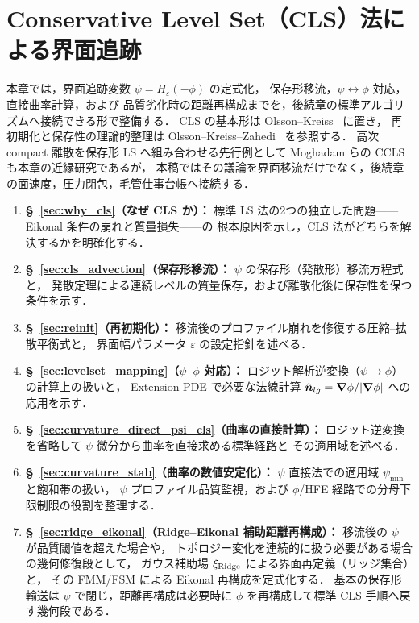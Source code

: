 \section{Conservative Level Set（CLS）法による界面追跡}
\label{sec:levelset}

本章では，界面追跡変数 $\psi = H_\varepsilon(-\phi)$ の定式化，
保存形移流，$\psi\leftrightarrow\phi$ 対応，直接曲率計算，および
品質劣化時の距離再構成までを，後続章の標準アルゴリズムへ接続できる形で整備する．
CLS の基本形は Olsson--Kreiss~\cite{OlssonKreiss2005} に置き，
再初期化と保存性の理論的整理は Olsson--Kreiss--Zahedi~\cite{OlssonKreissZahedi2007} を参照する．
高次 compact 離散を保存形 LS へ組み合わせる先行例として
Moghadam らの CCLS~\cite{MoghadamShafieefarPanahi2016} も本章の近縁研究であるが，
本稿ではその議論を界面移流だけでなく，後続章の面速度，圧力閉包，毛管仕事台帳へ接続する．

\begin{enumerate}
  \item \textbf{§~\ref{sec:why_cls}（なぜ CLS か）：}
        標準 LS 法の2つの独立した問題——Eikonal 条件の崩れと質量損失——の
        根本原因を示し，CLS 法がどちらを解決するかを明確化する．
  \item \textbf{§~\ref{sec:cls_advection}（保存形移流）：}
        $\psi$ の保存形（発散形）移流方程式と，
        発散定理による連続レベルの質量保存，および離散化後に保存性を保つ条件を示す．
  \item \textbf{§~\ref{sec:reinit}（再初期化）：}
        移流後のプロファイル崩れを修復する圧縮--拡散平衡式と，
        界面幅パラメータ $\varepsilon$ の設定指針を述べる．
  \item \textbf{§~\ref{sec:levelset_mapping}（$\psi$--$\phi$ 対応）：}
        ロジット解析逆変換（$\psi \to \phi$）の計算上の扱いと，
        Extension PDE で必要な法線計算 $\hat{\bm n}_{lg} = \bm{\nabla}\phi/|\bm{\nabla}\phi|$ への応用を示す．
  \item \textbf{§~\ref{sec:curvature_direct_psi_cls}（曲率の直接計算）：}
        ロジット逆変換を省略して $\psi$ 微分から曲率を直接求める標準経路と
        その適用域を述べる．
  \item \textbf{§~\ref{sec:curvature_stab}（曲率の数値安定化）：}
        $\psi$ 直接法での適用域 $\psi_{\min}$ と飽和帯の扱い，
        $\psi$ プロファイル品質監視，および $\phi$/HFE 経路での分母下限制限の役割を整理する．
  \item \textbf{§~\ref{sec:ridge_eikonal}（Ridge--Eikonal 補助距離再構成）：}
        移流後の $\psi$ が品質閾値を超えた場合や，
        トポロジー変化を連続的に扱う必要がある場合の幾何修復段として，
        ガウス補助場 $\xi_{\text{Ridge}}$ による界面再定義（リッジ集合）と，
        その FMM/FSM による Eikonal 再構成を定式化する．
        基本の保存形輸送は $\psi$ で閉じ，距離再構成は必要時に
        $\phi$ を再構成して標準 CLS 手順へ戻す幾何段である．
\end{enumerate}

